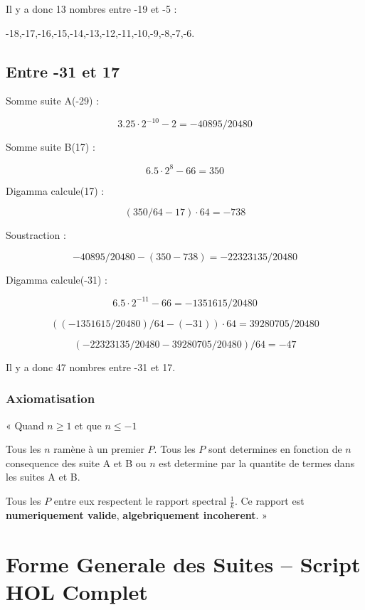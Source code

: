 \documentclass[a4paper,11pt]{article}
\begin{document}
Il y a donc 13 nombres entre -19 et -5 :

-18,-17,-16,-15,-14,-13,-12,-11,-10,-9,-8,-7,-6.

\subsection*{Entre -31 et 17}

Somme suite A(-29) :

\[
3.25 \cdot 2^{-10} - 2 = -40895/20480
\]

Somme suite B(17) :

\[
6.5 \cdot 2^{8} - 66 = 350
\]

Digamma calcule(17) :

\[
(350/64 - 17) \cdot 64 = -738
\]

Soustraction :

\[
-40895/20480 - (350 - 738) = -22323135/20480
\]

Digamma calcule(-31) :

\[
6.5 \cdot 2^{-11} - 66 = -1351615/20480
\]

\[
((-1351615/20480)/64 - (-31)) \cdot 64 = 39280705/20480
\]

\[
(-22323135/20480 - 39280705/20480)/64 = -47
\]

Il y a donc 47 nombres entre -31 et 17.


\subsubsection{Axiomatisation}

\begin{tcolorbox}[colback=blue!5,colframe=holblue,title={\textbf{Axiomatisation du Rapport Spectral}}]
« Quand $n \geq 1$ et que $n \leq -1$

Tous les $n$ ramène à un premier $P$. Tous les $P$ sont determines en fonction de $n$ consequence des suite A et B ou $n$ est determine par la quantite de termes dans les suites A et B.

Tous les $P$ entre eux respectent le rapport spectral $\frac{1}{k}$. Ce rapport est \textbf{numeriquement valide}, \textbf{algebriquement incoherent}. »
\end{tcolorbox}

\newpage
\section{Forme Generale des Suites -- Script HOL Complet}
\end{document}
